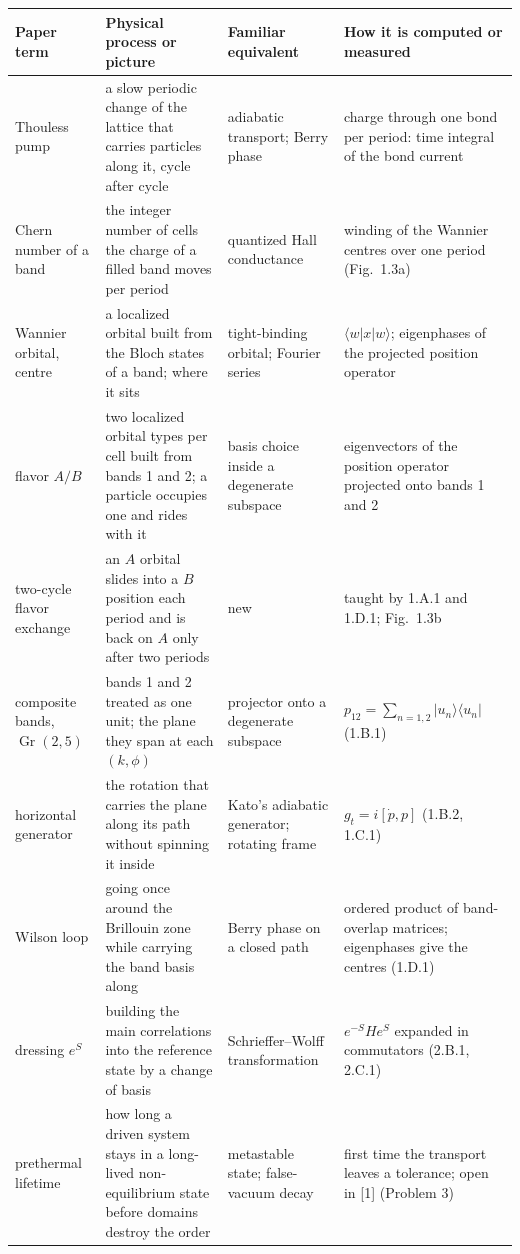 \documentclass[11pt,a4paper]{article}
\newcommand{\ket}[1]{\lvert #1\rangle}
\newcommand{\bra}[1]{\langle #1\rvert}
\begin{document}
{\small\begin{tabularx}{\textwidth}{@{}>{\raggedright\arraybackslash}p{24mm}YYY@{}}\toprule
Paper term&Physical process or picture&Familiar equivalent&How it is computed or measured\\\midrule
Thouless pump&a slow periodic change of the lattice that carries particles along it, cycle after cycle&adiabatic transport; Berry phase&charge through one bond per period: time integral of the bond current\\
Chern number of a band&the integer number of cells the charge of a filled band moves per period&quantized Hall conductance&winding of the Wannier centres over one period (Fig.~1.3a)\\
Wannier orbital, centre&a localized orbital built from the Bloch states of a band; where it sits&tight-binding orbital; Fourier series&$\langle w|x|w\rangle$; eigenphases of the projected position operator\\
flavor $A/B$&two localized orbital types per cell built from bands 1 and 2; a particle occupies one and rides with it&basis choice inside a degenerate subspace&eigenvectors of the position operator projected onto bands 1 and 2\\
two-cycle flavor exchange&an $A$ orbital slides into a $B$ position each period and is back on $A$ only after two periods&new&taught by 1.A.1 and 1.D.1; Fig.~1.3b\\
composite bands, $\operatorname{Gr}(2,5)$&bands 1 and 2 treated as one unit; the plane they span at each $(k,\phi)$&projector onto a degenerate subspace&$p_{12}=\sum_{n=1,2}\ket{u_n}\bra{u_n}$ (1.B.1)\\
horizontal generator&the rotation that carries the plane along its path without spinning it inside&Kato's adiabatic generator; rotating frame&$g_t=i[\dot p,p]$ (1.B.2, 1.C.1)\\
Wilson loop&going once around the Brillouin zone while carrying the band basis along&Berry phase on a closed path&ordered product of band-overlap matrices; eigenphases give the centres (1.D.1)\\
dressing $e^S$&building the main correlations into the reference state by a change of basis&Schrieffer--Wolff transformation&$e^{-S}He^{S}$ expanded in commutators (2.B.1, 2.C.1)\\
prethermal lifetime&how long a driven system stays in a long-lived non-equilibrium state before domains destroy the order&metastable state; false-vacuum decay&first time the transport leaves a tolerance; open in [1] (Problem 3)\\\bottomrule
\end{tabularx}}
\end{document}
